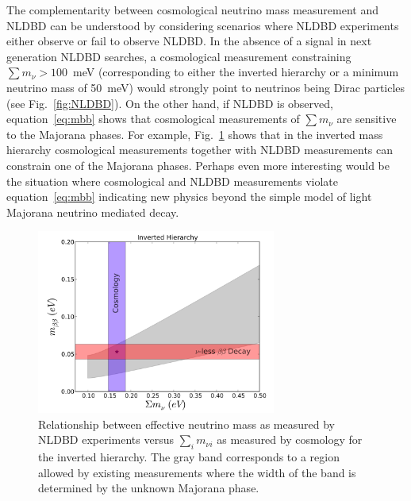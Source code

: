The complementarity between cosmological neutrino mass measurement and NLDBD can be understood by considering scenarios where NLDBD experiments either observe or fail to observe NLDBD. In the absence of a signal in next generation NLDBD searches, a cosmological measurement constraining $\sum m_\nu > 100$~meV (corresponding to either the inverted hierarchy or a minimum neutrino mass of 50~meV) would strongly point to neutrinos being Dirac particles (see Fig.~\ref{fig:NLDBD}). On the other hand, if NLDBD is observed, equation~\ref{eq:mbb} shows that cosmological measurements of $\sum m_\nu$ are sensitive to the Majorana phases. For example, Fig.~\ref{fig:MajoranaPhase} shows that in the inverted mass hierarchy cosmological measurements together with NLDBD measurements can constrain one of the Majorana phases. Perhaps even more interesting would be the situation where cosmological and NLDBD measurements violate equation~\ref{eq:mbb} indicating new physics beyond the simple model of light Majorana neutrino mediated decay.

\begin{figure}[h!]
\centering \includegraphics[width=0.70\textwidth]{Neutrinos/IH_MajoranaPhase.png}
\caption{Relationship between effective neutrino mass as measured by NLDBD experiments versus $\sum_i m_{\nu i}$ as measured by cosmology for the inverted hierarchy. The gray band corresponds to a region allowed by existing measurements where the width of the band is determined by the unknown Majorana phase. }
\label{fig:MajoranaPhase}
\end{figure}



